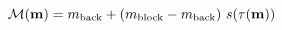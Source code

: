 \begin{equation}
\mathcal{M}(\mathbf{m}) =
    m_{\rm back} +
    (m_{\rm block} - m_{\rm back})~s(\tau(\mathbf{m}))
\label{eq:mapping_block}
\end{equation}
